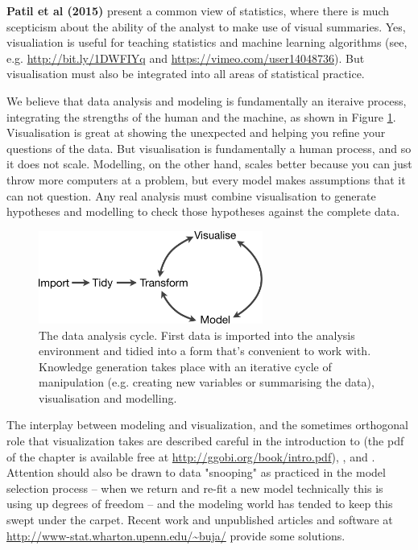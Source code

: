 \documentclass[preprint]{imsart}
\begin{document}

\textbf{Patil et al (2015)} present a common view of statistics, where there is much scepticism about the ability of the analyst to make use of visual summaries. Yes, visualiation is useful for teaching statistics and machine learning algorithms (see, e.g. \url{http://bit.ly/1DWFIYq} and \url{https://vimeo.com/user14048736}). But visualisation must also be integrated into all areas of statistical practice.

We believe that data analysis and modeling is fundamentally an iteraive process, integrating the strengths of the human and the machine, as shown in Figure \ref{fig:cycle}. Visualisation is great at showing the unexpected and helping you refine your questions of the data. But visualisation is fundamentally a human process, and so it does not scale. Modelling, on the other hand, scales better because you can just throw more computers at a problem, but every model makes assumptions that it can not question. Any real analysis must combine visualisation to generate hypotheses and modelling to check those hypotheses against the complete data.

\begin{figure}[htbp]
  \centering
  \includegraphics[height=1.2in]{cycle-crop}
  \caption{The data analysis cycle. First data is imported into the analysis environment and tidied into a form that's convenient to work with. Knowledge generation takes place with an iterative cycle of manipulation (e.g. creating new variables or summarising the data), visualisation and modelling.}
  \label{fig:cycle}
\end{figure}

The interplay between modeling and visualization, and the sometimes orthogonal role that visualization takes are described careful in the introduction to \cite{cook:2007} (the pdf of the chapter is available free at \url{http://ggobi.org/book/intro.pdf}), \cite{Ch95}, and \cite{CH90}. Attention should also be drawn to data "snooping" as practiced in the model selection process -- when we return and re-fit a new model technically this is using up degrees of freedom -- and the modeling world has tended to keep this swept under the carpet. Recent work \cite{berk:2013} and unpublished articles and software at \url{http://www-stat.wharton.upenn.edu/~buja/} provide some solutions.
\end{document}
